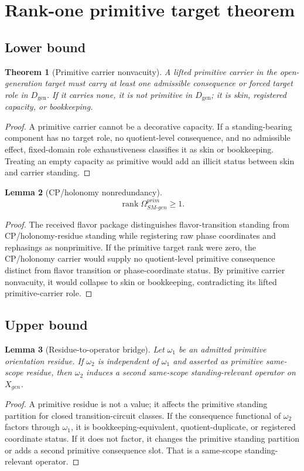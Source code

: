 \documentclass[11pt]{article}
\newcommand{\Dgen}{D_{\mathrm{gen}}}
\newcommand{\rank}{\operatorname{rank}}
\theoremstyle{definition}
\theoremstyle{plain}
\newtheorem{theorem}{Theorem}[section]
\newtheorem{lemma}[theorem]{Lemma}
\theoremstyle{remark}
\begin{document}
\section{Rank-one primitive target theorem}

\subsection{Lower bound}
\begin{theorem}[Primitive carrier nonvacuity]
A lifted primitive carrier in the open-generation target must carry at least one admissible consequence or forced target role in \(\Dgen\). If it carries none, it is not primitive in \(\Dgen\); it is skin, registered capacity, or bookkeeping.
\end{theorem}
\begin{proof}
A primitive carrier cannot be a decorative capacity. If a standing-bearing component has no target role, no quotient-level consequence, and no admissible effect, fixed-domain role exhaustiveness classifies it as skin or bookkeeping. Treating an empty capacity as primitive would add an illicit status between skin and carrier standing.
\end{proof}

\begin{lemma}[CP/holonomy nonredundancy]
\[
\rank \Omega_{SM\text{-}gen}^{prim}\ge 1.
\]
\end{lemma}
\begin{proof}
The received flavor package distinguishes flavor-transition standing from CP/holonomy-residue standing while registering raw phase coordinates and rephasings as nonprimitive. If the primitive target rank were zero, the CP/holonomy carrier would supply no quotient-level primitive consequence distinct from flavor transition or phase-coordinate status. By primitive carrier nonvacuity, it would collapse to skin or bookkeeping, contradicting its lifted primitive-carrier role.
\end{proof}

\subsection{Upper bound}
\begin{lemma}[Residue-to-operator bridge]
Let \(\omega_1\) be an admitted primitive orientation residue. If \(\omega_2\) is independent of \(\omega_1\) and asserted as primitive same-scope residue, then \(\omega_2\) induces a second same-scope standing-relevant operator on \(X_{gen}\).
\end{lemma}
\begin{proof}
A primitive residue is not a value; it affects the primitive standing partition for closed transition-circuit classes. If the consequence functional of \(\omega_2\) factors through \(\omega_1\), it is bookkeeping-equivalent, quotient-duplicate, or registered coordinate status. If it does not factor, it changes the primitive standing partition or adds a second primitive consequence slot. That is a same-scope standing-relevant operator.
\end{proof}
\end{document}

